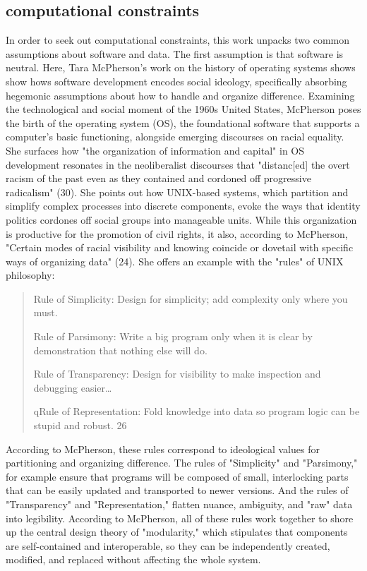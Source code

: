 \documentclass[11pt]{article}
\begin{document}
\subsection{computational constraints}
\label{sec:orgde14334}
In order to seek out computational constraints, this work unpacks two
common assumptions about software and data. The first assumption is
that software is neutral. Here, Tara McPherson's work on the history
of operating systems shows show hows software development encodes
social ideology, specifically absorbing hegemonic assumptions about
how to handle and organize difference. Examining the technological and
social moment of the 1960s United States, McPherson poses the birth of
the operating system (OS), the foundational software that supports a
computer's basic functioning, alongside emerging discourses on racial
equality. She surfaces how "the organization of information and
capital" in OS development resonates in the neoliberalist discourses
that "distanc[ed] the overt racism of the past even as they contained
and cordoned off progressive radicalism" (30). She points out how
UNIX-based systems, which partition and simplify complex processes
into discrete components, evoke the ways that identity politics
cordones off social groups into manageable units. While this
organization is productive for the promotion of civil rights, it also,
according to McPherson, "Certain modes of racial visibility and
knowing coincide or dovetail with specific ways of organizing data"
(24). She offers an example with the "rules" of UNIX philosophy:
\begin{quote}
Rule of Simplicity: Design for simplicity; add complexity only where
you must. 

Rule of Parsimony: Write a big program only when it is clear by
demonstration that nothing else will do. 

Rule of Transparency: Design for visibility to make inspection and
debugging easier\ldots{} 

qRule of Representation: Fold knowledge into data
so program logic can be stupid and robust. 26
\end{quote}
According to McPherson, these rules correspond to ideological values
for partitioning and organizing difference. The rules of "Simplicity"
and "Parsimony," for example ensure that programs will be composed of
small, interlocking parts that can be easily updated and transported
to newer versions. And the rules of "Transparency" and
"Representation," flatten nuance, ambiguity, and "raw" data into
legibility. According to McPherson, all of these rules work together
to shore up the central design theory of "modularity," which
stipulates that components are self-contained and interoperable, so
they can be independently created, modified, and replaced without
affecting the whole system.
\end{document}

